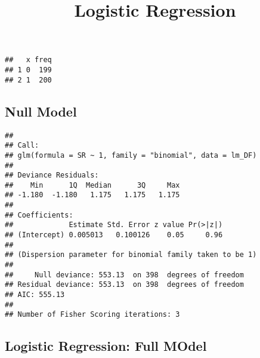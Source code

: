 \documentclass[]{article}
\title{Logistic Regression}
\author{}
\date{}
\begin{document}
\maketitle

\newpage

\begin{verbatim}
##   x freq
## 1 0  199
## 2 1  200
\end{verbatim}

\newpage

\hypertarget{null-model}{%
\subsection{Null Model}\label{null-model}}

\begin{verbatim}
## 
## Call:
## glm(formula = SR ~ 1, family = "binomial", data = lm_DF)
## 
## Deviance Residuals: 
##    Min      1Q  Median      3Q     Max  
## -1.180  -1.180   1.175   1.175   1.175  
## 
## Coefficients:
##             Estimate Std. Error z value Pr(>|z|)
## (Intercept) 0.005013   0.100126    0.05     0.96
## 
## (Dispersion parameter for binomial family taken to be 1)
## 
##     Null deviance: 553.13  on 398  degrees of freedom
## Residual deviance: 553.13  on 398  degrees of freedom
## AIC: 555.13
## 
## Number of Fisher Scoring iterations: 3
\end{verbatim}

\newpage

\hypertarget{logistic-regression-full-model}{%
\subsection{Logistic Regression: Full
MOdel}\label{logistic-regression-full-model}}
\end{document}
